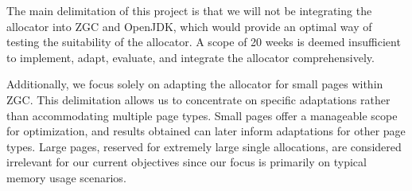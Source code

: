 
The main delimitation of this project is that we will not be integrating the allocator into ZGC and OpenJDK, which would provide an optimal way of testing the suitability of the allocator. A scope of 20 weeks is deemed insufficient to implement, adapt, evaluate, and integrate the allocator comprehensively.

Additionally, we focus solely on adapting the allocator for small pages within ZGC. This delimitation allows us to concentrate on specific adaptations rather than accommodating multiple page types. Small pages offer a manageable scope for optimization, and results obtained can later inform adaptations for other page types. Large pages, reserved for extremely large single allocations, are considered irrelevant for our current objectives since our focus is primarily on typical memory usage scenarios.

